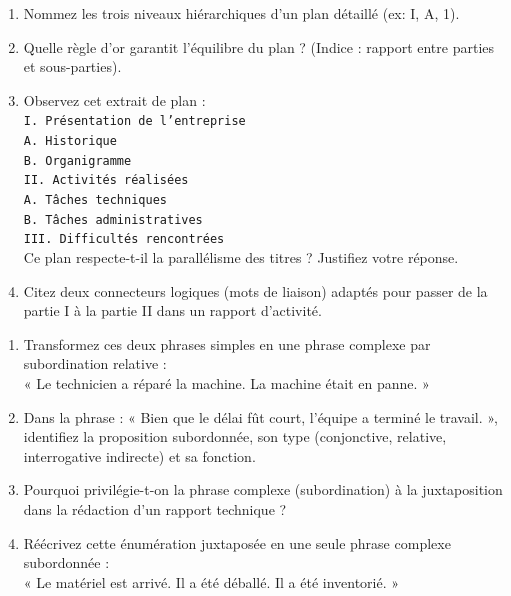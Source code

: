 \documentclass[11pt]{article}
\begin{document}
\begin{exercice}
\begin{enumerate}
    \item Nommez les trois niveaux hiérarchiques d'un plan détaillé (ex: I, A, 1).
    \item Quelle règle d'or garantit l'équilibre du plan ? (Indice : rapport entre parties et sous-parties).
    \item Observez cet extrait de plan :\\
    \texttt{I. Présentation de l'entreprise\\
    A. Historique\\
    B. Organigramme\\
    II. Activités réalisées\\
    A. Tâches techniques\\
    B. Tâches administratives\\
    III. Difficultés rencontrées}\\
    Ce plan respecte-t-il la parallélisme des titres ? Justifiez votre réponse.
    \item Citez deux connecteurs logiques (mots de liaison) adaptés pour passer de la partie I à la partie II dans un rapport d'activité.
\end{enumerate}
\end{exercice}

\begin{exercice}
\begin{enumerate}
    \item Transformez ces deux phrases simples en une phrase complexe par subordination relative :\\
    « Le technicien a réparé la machine. La machine était en panne. »
    \item Dans la phrase : « Bien que le délai fût court, l'équipe a terminé le travail. », identifiez la proposition subordonnée, son type (conjonctive, relative, interrogative indirecte) et sa fonction.
    \item Pourquoi privilégie-t-on la phrase complexe (subordination) à la juxtaposition dans la rédaction d'un rapport technique ?
    \item Réécrivez cette énumération juxtaposée en une seule phrase complexe subordonnée :\\
    « Le matériel est arrivé. Il a été déballé. Il a été inventorié. »
\end{enumerate}
\end{exercice}
\end{document}
